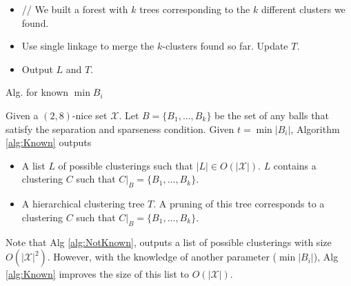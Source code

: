\documentclass[11pt]{article}
\newenvironment{alg}{
    \begin{list}{}{
        \setlength{\itemsep}{2pt}
        \setlength{\parsep}{0pt}
        \setlength{\parskip}{0pt}
        \setlength{\topsep}{1pt}
    }
}
{
    \end{list}
}
\begin{document}
\begin{algorithm}
\begin{alg}
\begin{itemize}
\item[] // We built a forest with $k$ trees corresponding to the $k$ different clusters we found. 
\item[] Use single linkage to merge the $k$-clusters found so far. Update $T$.
\item[] Output $L$ and $T$.
\end{itemize}
\label{alg:Known}
\end{alg}
\caption{Alg. for known $\min{B_i}$}
\end{algorithm}

\begin{theorem}
Given a $(2,8)$-nice set $\mathcal{X}$. Let $B = \{B_1,\ldots,B_k\}$ be the set of any balls that satisfy the separation and sparseness condition. Given $t = \min |B_i|$, Algorithm \ref{alg:Known} outputs 
\begin{itemize}
\item A list $L$ of possible clusterings such that $|L| \in O(|\mathcal{X}|)$. $L$ contains a clustering $C$ such that $C|_B = \{B_1,\ldots,B_k\}$.
\item A hierarchical clustering tree $T$. A pruning of this tree corresponds to a clustering $C$ such that $C|_B = \{B_1,\ldots,B_k\}$.
\end{itemize}
\end{theorem}

\noindent Note that Alg \ref{alg:NotKnown}, outputs a list of possible clusterings with size $O(|\mathcal{X}|^2)$. However, with the knowledge of another parameter ($\min|B_i|$), Alg \ref{alg:Known} improves the size of this list to $O(|\mathcal{X}|)$.
\end{document}
